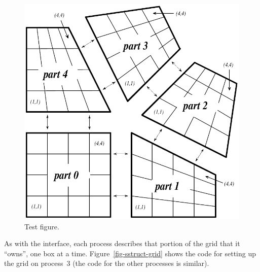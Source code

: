 \begin{figure}
\centering
\includegraphics[width=.4\textwidth]{figSStructExample1c}
\caption{%
Test figure.}
\label{fig-sstruct-example-parts}
\end{figure}

As with the  interface, each process describes that portion of the
grid that it ``owns'', one box at a time.  Figure~\ref{fig-sstruct-grid} shows
the code for setting up the grid on process~3 (the code for the other processes
is similar).
